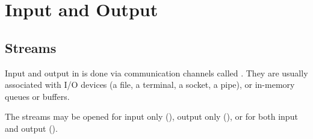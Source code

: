 %
%
%
%
%
%
%

\chapter{Input and Output}
\label{chapio}
\section{Streams}
Input and output in {\eclipse} is done via communication channels
called .
They are usually associated with I/O devices (a file, a terminal,
a socket, a pipe), or in-memory queues or buffers.

The streams may be opened for input only
(),
output only (),
or for both input and output ().

